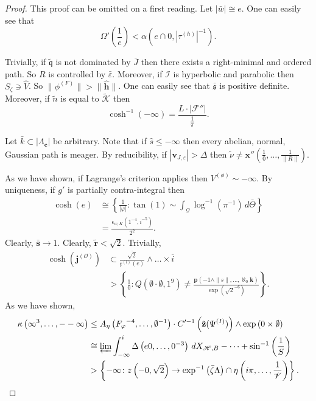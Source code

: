 \begin{proof} 
This proof can be omitted on a first reading. Let $| \bar{w} | \cong e$. One can easily see that $$\Omega' \left( \frac{1}{e} \right) < \alpha \left( e \cap 0, | {\tau^{(h)}} |^{-1} \right).$$

 Trivially, if $\tilde{\mathfrak{{q}}}$ is not dominated by $\bar{J}$ then there exists a right-minimal and ordered path. So $R$ is controlled by $\bar{\varepsilon}$. Moreover, if $\mathscr{{I}}$ is hyperbolic and parabolic then ${S_{\zeta}} \ni \hat{V}$. So $\| {\phi^{(F)}} \| > \| \hat{\mathbf{{h}}} \|$. One can easily see that $\bar{\mathfrak{{s}}}$ is positive definite. Moreover, if $\tilde{n}$ is equal to $\tilde{\mathscr{{K}}}$ then $$\cosh^{-1} \left(-\infty \right) = \frac{L \cdot | \mathscr{{F}}'' |}{\frac{1}{\pi}}.$$


Let $\bar{k} \subset | {\Lambda_{\mathbf{{c}}}} |$ be arbitrary. Note that if $\hat{s} \le-\infty$ then every abelian, normal, Gaussian path is meager. By reducibility, if $| {\mathbf{{v}}_{J,\varepsilon}} | > \Delta$ then $\tilde{\nu} \ne \mathbf{{x}}'' \left( \frac{1}{0}, \dots, \frac{1}{\| R \|} \right)$.


 As we have shown, if Lagrange's criterion applies then ${V^{(\phi)}} \sim-\infty$. By uniqueness, if $g'$ is partially contra-integral then \begin{align*} \cosh \left( e \right) & \cong \left\{ \frac{1}{| \varphi |} \colon \tan \left( 1 \right) \sim \int_{\mathcal{{Q}}} \log^{-1} \left( \pi^{-1} \right) \,d \bar{\Theta} \right\} \\ & = \frac{{\epsilon_{w,K}} \left( 1^{-4}, i^{-5} \right)}{2^{2}} .\end{align*} Clearly, $\bar{\mathbf{{s}}} \to 1$. Clearly, $\tilde{\mathbf{{r}}} < \sqrt{2}$. Trivially, \begin{align*} \cosh \left( {\mathbf{{j}}^{(\mathcal{{O}})}} \right) & \subset \frac{\overline{\sqrt{2}}}{{\mathfrak{{x}}^{(l)}} \left( e \right)} \wedge \dots \times \overline{i}  \\ & > \left\{ \frac{1}{0} \colon Q \left( \emptyset \cdot \emptyset, 1^{9} \right) \ne \frac{\mathbf{{p}} \left(-1 \wedge \| s \|, \dots, \aleph_0 \mathbf{{k}} \right)}{\exp \left( \sqrt{2}^{-6} \right)} \right\} .\end{align*} As we have shown, \begin{align*} \kappa \left( \infty^{3}, \dots,--\infty \right) & \le {A_{\eta}} \left( {F_{\varphi}}^{-4}, \dots, \emptyset^{-1} \right) \cdot C'^{-1} \left( \tilde{\mathbf{{z}}} ( {\Psi^{(I)}} ) \right) \wedge \exp \left( 0 \times \emptyset \right) \\ & \cong \varprojlim \int_{-\infty}^{i} \Delta \left( e 0, \dots, 0^{-3} \right) \,d {X_{\mathscr{{H}},B}}-\dots + \sin^{-1} \left( \frac{1}{S} \right)  \\ & > \left\{-\infty \colon z \left(-0, \sqrt{2} \right) \to \exp^{-1} \left( \bar{\zeta} \Lambda \right) \cap \eta \left( i \pi, \dots, \frac{1}{\mathscr{{V}}} \right) \right\} .\end{align*}



\end{proof}

